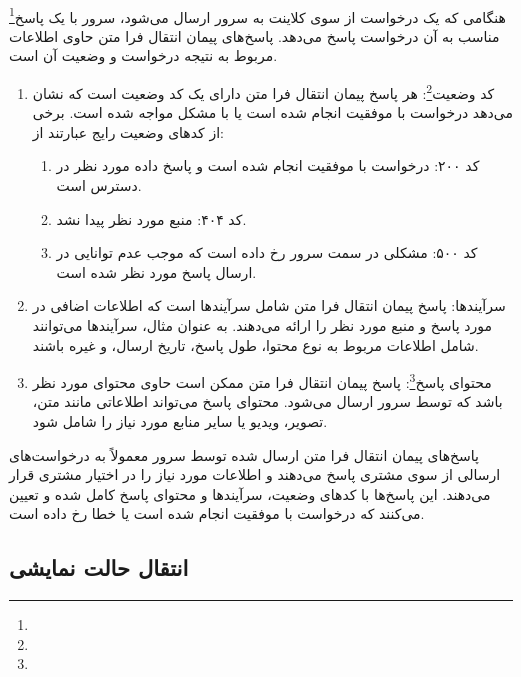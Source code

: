 \paragraph{}
{
    هنگامی که یک درخواست از سوی کلاینت به سرور ارسال می‌شود، سرور با یک پاسخ\footnote{} مناسب به آن درخواست پاسخ می‌دهد. پاسخ‌های پیمان انتقال فرا متن حاوی اطلاعات مربوط به نتیجه درخواست و وضعیت آن است.
    \begin{enumerate}
        \item کد وضعیت\footnote{}: هر پاسخ پیمان انتقال فرا متن دارای یک کد وضعیت است که نشان می‌دهد درخواست با موفقیت انجام شده است یا با مشکل مواجه شده است. برخی از کدهای وضعیت رایج عبارتند از:
        \begin{enumerate}
            \item کد ۲۰۰: درخواست با موفقیت انجام شده است و پاسخ داده مورد نظر در دسترس است.
            \item کد ۴۰۴: منبع مورد نظر پیدا نشد.
            \item کد ۵۰۰: مشکلی در سمت سرور رخ داده است که موجب عدم توانایی در ارسال پاسخ مورد نظر شده است.
        \end{enumerate}
        \item سرآیندها: پاسخ پیمان انتقال فرا متن شامل سرآیندها است که اطلاعات اضافی در مورد پاسخ و منبع مورد نظر را ارائه می‌دهند. به عنوان مثال، سرآیندها می‌توانند شامل اطلاعات مربوط به نوع محتوا، طول پاسخ، تاریخ ارسال، و غیره باشند.
        \item محتوای پاسخ\footnote{}: پاسخ پیمان انتقال فرا متن ممکن است حاوی محتوای مورد نظر باشد که توسط سرور ارسال می‌شود. محتوای پاسخ می‌تواند اطلاعاتی مانند متن، تصویر، ویدیو یا سایر منابع مورد نیاز را شامل شود.
    \end{enumerate}
    پاسخ‌های پیمان انتقال فرا متن ارسال شده توسط سرور معمولاً به درخواست‌های ارسالی از سوی مشتری پاسخ می‌دهند و اطلاعات مورد نیاز را در اختیار مشتری قرار می‌دهند. این پاسخ‌ها با کدهای وضعیت، سرآیندها و محتوای پاسخ کامل شده و تعیین می‌کنند که درخواست با موفقیت انجام شده است یا خطا رخ داده است.
}

\subsection{انتقال حالت نمایشی}
\label{subsec:rest}
